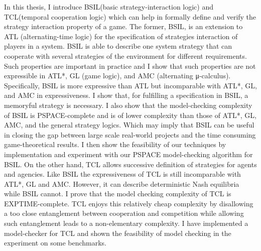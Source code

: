 \begin{abstractEN}

In this thesis, I introduce BSIL(basic strategy-interaction logic) and TCL(temporal cooperation logic) which can help in formally define and verify the strategy interaction property of a game.
The former, BSIL, is an extension to ATL (alternating-time logic) for the specification of strategies interaction of players in a system. BSIL is able to describe one system strategy that can cooperate with several strategies of the environment for different requirements. Such properties are important in practice and I show that such properties are not expressible in ATL*, GL (game logic), and AMC (alternating μ-calculus). Specifically, BSIL is more expressive than ATL but incomparable with ATL*, GL, and AMC in expressiveness. I show that, for fulfilling a specification in BSIL, a memoryful strategy is necessary. I also show that the model-checking complexity of BSIL is PSPACE-complete and is of lower complexity than those of ATL*, GL, AMC, and the general strategy logics. Which may imply that BSIL can be useful in closing the gap between large scale real-world projects and the time consuming game-theoretical results. I then show the feasibility of our techniques by implementation and experiment with our PSPACE model-checking algorithm for BSIL.
On the other hand, TCL allows successive definition of strategies for agents and agencies. Like BSIL the expressiveness of TCL is still incomparable with ATL*, GL and AMC. However, it can describe deterministic Nash equilibria while BSIL cannot. I prove that the model checking complexity of TCL is EXPTIME-complete. TCL enjoys this relatively cheap complexity by disallowing a too close entanglement between cooperation and competition while allowing such entanglement leads to a non-elementary complexity. I have implemented a model-checker for TCL and shown the feasibility of model checking in the experiment on some benchmarks.

\end{abstractEN}
